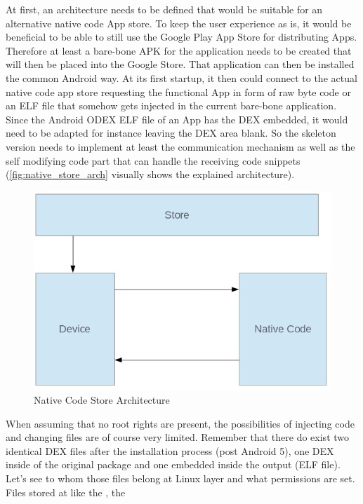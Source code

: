 At first, an architecture needs to be defined that would be suitable for an alternative native code App store. To keep the user experience as is, it would be beneficial to be able to still use the Google Play App Store for distributing Apps. Therefore at least a bare-bone APK for the application needs to be created that will then be placed into the Google Store.
That application can then be installed the common Android way. At its first startup, it then could connect to the actual native code app store
requesting the functional App in form of raw byte code or an ELF file that
somehow gets injected in the current bare-bone application.
Since the Android ODEX ELF file of an App has the DEX embedded, it would need
to be adapted for instance leaving the DEX area blank.
So the skeleton version needs to implement at least the communication mechanism as well as the self modifying code part that can handle the receiving code snippets (\autoref{fig:native_store_arch} visually shows
the explained architecture).
\begin{figure}[htb]
  \centering
  \includegraphics[scale=0.5]{figures/native_store_arch}
  \caption[Native Code Store Architecture]{Native Code Store Architecture}
  \label{fig:native_store_arch}
\end{figure}
When assuming that no root rights are present, the possibilities of injecting code and changing files are of course very limited. Remember that there do exist two identical DEX files after the installation process (post Android 5), one DEX inside of the original  package and one embedded inside the  output (ELF file).
Let's see to whom those files belong at Linux layer and what permissions are set. Files stored at  like the , the 
